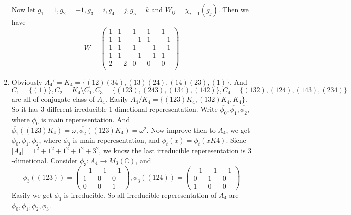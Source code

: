 \documentclass{ctexart}
\begin{document}
\begin{solution}
\begin{enumerate}
		      Now let \(g_1 = 1,g_2 = -1,g_3 = i,g_4 = j,g_5 = k\) and \(W_{ij}=\chi_{i-1}( g_j)\). Then we have
		      \[
			      W=\begin{pmatrix}
				      1 & 1  & 1  & 1  & 1  \\
				      1 & 1  & -1 & 1  & -1 \\
				      1 & 1  & 1  & -1 & -1 \\
				      1 & 1  & -1 & -1 & 1  \\
				      2 & -2 & 0  & 0  & 0  \\
			      \end{pmatrix}
		      \]
		\item
		      Obviously \(A_4'=K_4=\{(1 2)(3 4),(1 3)(2 4),(1 4)(2 3),(1)\}\).
		      And \(C_1=\{(1)\}, C_2=K_4 \setminus C_1,C_3=\{(1 2 3),(243),(134),(142)\}, C_4=\{(132),(124),(143),(234)\}\) are all of conjugate class of \(A_4\).
		      Easily \(A_4/K_4=\{(123)K_4,(132)K_4,K_4\}\). So it has \(3\) different irreducible \(1\)-dimetional reperesentation.
		      Write \(\overline{\phi_0},\overline{\phi_1},\overline{\phi_2}\), where \(\overline{\phi_0}\) is main reperesentation.
		      And \(\overline{\phi_1}((123)K_4)=\omega,\overline{\phi_2}((123)K_4)=\omega^2\).
		      Now improve then to \(A_4\), we get \(\phi_0,\phi_1,\phi_2\), where \(\phi_0\) is main reperesentation, and
		      \(\phi_t(x)=\overline{\phi_t}(xK4)\).
		      Sicne \(|A_4|=1^2+1^2+1^2+1^2+3^2\), we know the last irreducible reperesentation is \(3\)-dimetional.
		      Consider \(\phi_3:A_4 \to M_3(\mathbb{C})\), and
		      \[
			      \phi_3((123))=\begin{pmatrix}
				      -1 & -1 & -1 \\
				      1  & 0  & 0  \\
				      0  & 0  & 1
			      \end{pmatrix}, \phi_3((124))=\begin{pmatrix}
				      -1 & -1 & -1 \\
				      0  & 1  & 0  \\
				      1  & 0  & 0
			      \end{pmatrix}
		      \]
		      Easily we get \(\phi_3\) is irreducible. So all irreducible reperesentation of \(A_4\) are \(\phi_0,\phi_1,\phi_2,\phi_3\).


\end{enumerate}
\end{solution}
\end{document}
